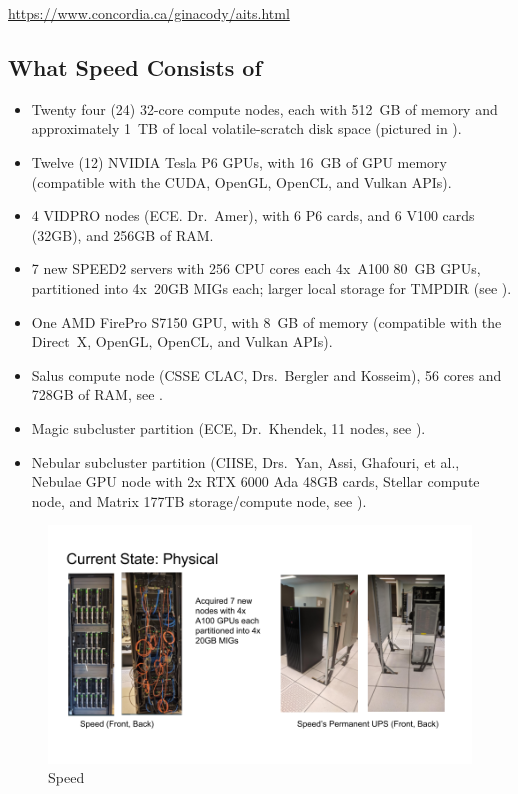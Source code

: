 \url{https://www.concordia.ca/ginacody/aits.html}

\subsection{What Speed Consists of}
\label{sect:speed-arch}

\begin{itemize}
	\item Twenty four (24) 32-core compute nodes, each with 512~GB of memory and
	approximately 1~TB of local volatile-scratch disk space (pictured in ).

	\item Twelve (12) NVIDIA Tesla P6 GPUs, with 16~GB of GPU memory (compatible with the
	CUDA, OpenGL, OpenCL, and Vulkan APIs).

	\item 4 VIDPRO nodes (ECE. Dr.~Amer), with 6 P6 cards, and 6 V100 cards (32GB), and
	256GB of RAM.

	\item 7 new SPEED2 servers with 256 CPU cores each 4x~A100 80~GB GPUs, partitioned
	into 4x~20GB MIGs each; larger local storage for TMPDIR (see ).

	\item One AMD FirePro S7150 GPU, with 8~GB of memory (compatible with the
	Direct~X, OpenGL, OpenCL, and Vulkan APIs).

 	\item Salus compute node (CSSE CLAC, Drs.~Bergler and Kosseim), 56 cores and 728GB of RAM,
	see .

	\item Magic subcluster partition (ECE, Dr.~Khendek, 11 nodes, see ).

	\item Nebular subcluster partition (CIISE, Drs.~Yan, Assi, Ghafouri, et al., Nebulae GPU node with 2x RTX 6000 Ada 48GB cards,
	Stellar compute node, and Matrix 177TB storage/compute node, see ).
\end{itemize}

\begin{figure}[htpb]
	\centering
	\includegraphics[width=\columnwidth]{images/speed-pics}
	\caption{Speed}
	\label{fig:speed-pics}
\end{figure}

